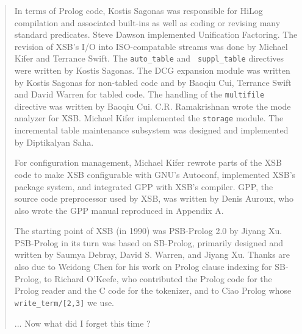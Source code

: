 \begin{quote}
In terms of Prolog code, Kostis Sagonas was responsible for HiLog
compilation and associated built-ins as well as coding or revising many
standard predicates.  Steve Dawson implemented Unification Factoring.
The revision of XSB's I/O into ISO-compatable streams was done by
Michael Kifer and Terrance Swift.  The {\tt auto\_table} and {\tt
suppl\_table} directives were written by Kostis Sagonas.  The DCG
expansion module was written by Kostis Sagonas for non-tabled code and
by Baoqiu Cui, Terrance Swift and David Warren for tabled code.  The
handling of the {\tt multifile} directive was written by Baoqiu
Cui. C.R. Ramakrishnan wrote the mode analyzer for XSB.  Michael Kifer
implemented the {\tt storage} module.  The incremental table
maintenance subsystem was designed and implemented by Diptikalyan
Saha.

For configuration management, Michael Kifer rewrote parts of the XSB
code to make XSB configurable with GNU's Autoconf, implemented XSB's
package system, and integrated GPP with XSB's compiler.  GPP, the
source code preprocessor used by XSB, was written by Denis Auroux, who
also wrote the GPP manual reproduced in Appendix A.

The starting point of XSB (in 1990) was PSB-Prolog 2.0 by Jiyang Xu.
PSB-Prolog in its turn was based on SB-Prolog, primarily designed and
written by Saumya Debray, David S. Warren, and Jiyang Xu.  Thanks are
also due to Weidong Chen for his work on Prolog clause indexing for
SB-Prolog, to Richard O'Keefe, who contributed the Prolog code for the
Prolog reader and the C code for the tokenizer, and to Ciao Prolog
whose {\tt write\_term/[2,3]} we use.

... Now what did I forget this time ?

\end{quote}

